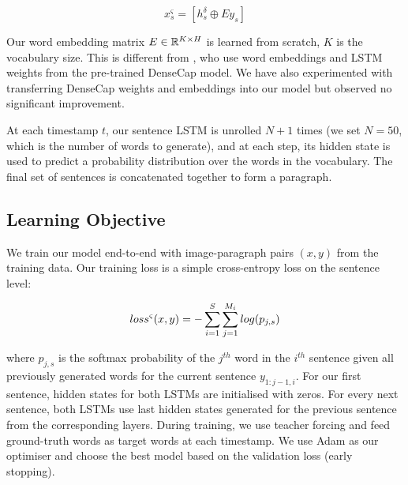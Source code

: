\documentclass[11pt,a4paper]{article}
\newcommand{\R}{\mathbb{R}}
\begin{document}
\begin{equation}
  x^\varsigma_s = [h^\delta_s \oplus Ey_s ]
\end{equation}


Our word embedding matrix $E \in \R\sp{K \times H}$ is learned from scratch, $K$ is the vocabulary size.
This is different from , who use word embeddings and LSTM weights from the pre-trained DenseCap model. %
We have also experimented with transferring DenseCap weights and embeddings into our model but observed no significant improvement.

At each timestamp $t$, our sentence LSTM is unrolled $N+1$ times (we set $N=50$, which is the number of words to generate), and at each step, its hidden state is used to predict a probability distribution over the words in the vocabulary.
The final set of sentences is concatenated together to form a paragraph.


\subsection{Learning Objective}
We train our model end-to-end with image-paragraph pairs $(x, y)$ from the training data.
Our training loss is a simple cross-entropy loss on the sentence level:

\begin{equation}
  loss\sp{\varsigma}(x, y) = - \sum_{i=1}^{S}\sum_{j=1}^{M_i} log(p_{j,s})
\end{equation}

where $p_{j,s}$ is the softmax probability of the $j^{th}$ word in the $i^{th}$ sentence given all previously generated words for the current sentence $y_{1:j-1,i}$.
For our first sentence, hidden states for both LSTMs are initialised with zeros.
For every next sentence, both LSTMs use last hidden states generated for the previous sentence from the corresponding layers.
During training, we use teacher forcing and feed ground-truth words as target words at each timestamp.
We use Adam \cite{adam14} as our optimiser and choose the best model based on the validation loss (early stopping).
\end{document}
